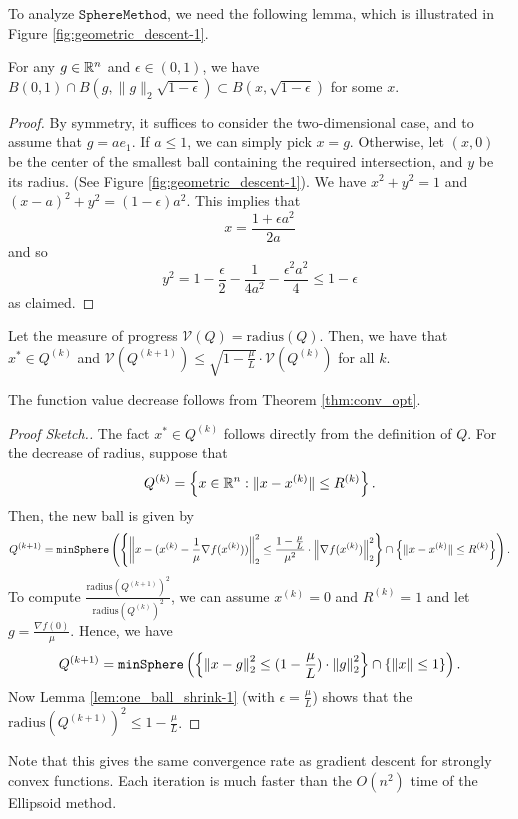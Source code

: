 To analyze $\mathtt{SphereMethod}$, we need the following lemma,
which is illustrated in Figure \ref{fig:geometric_descent-1}.
\begin{lem}
\label{lem:one_ball_shrink-1}For any $g\in\mathbb{R}^{n}$ and $\epsilon\in(0,1)$,
we have $B(0,1)\cap B(g,\|g\|_{2}\sqrt{1-\epsilon})\subset B(x,\sqrt{1-\epsilon})$
for some $x$.
\end{lem}

\begin{proof}
By symmetry, it suffices to consider the two-dimensional case, and
to assume that $g=ae_{1}$. If $a\leq1$, we can simply pick $x=g$.
Otherwise, let $(x,0)$ be the center of the smallest ball containing
the required intersection, and $y$ be its radius. (See Figure \ref{fig:geometric_descent-1}).
We have $x^{2}+y^{2}=1$ and $(x-a)^{2}+y^{2}=(1-\epsilon)a^{2}$.
This implies that 
\[
x=\frac{1+\epsilon a^{2}}{2a}
\]
and so 
\[
y^{2}=1-\frac{\epsilon}{2}-\frac{1}{4a^{2}}-\frac{\epsilon^{2}a^{2}}{4}\le1-\epsilon
\]
as claimed.
\end{proof}
\begin{lem}
Let the measure of progress $\mathcal{V}(Q)=\mathrm{radius}(Q)$.
Then, we have that $x^{*}\in Q^{(k)}$ and $\mathcal{V}(Q^{(k+1)})\leq\sqrt{1-\frac{\mu}{L}}\cdot\mathcal{V}(Q^{(k)})$
for all $k$.
\end{lem}

\begin{rem}
The function value decrease follows from Theorem \ref{thm:conv_opt}.
\end{rem}

\begin{proof}[Proof Sketch.]
The fact $x^{*}\in Q^{(k)}$ follows directly from the definition
of $Q$. For the decrease of radius, suppose that 
\[
Q^{(k)}=\left\{ x\in\mathbb{R}^{n}:\|x-x^{(k)}\|\leq R^{(k)}\right\} .
\]
Then, the new ball is given by
\[
Q^{(k+1)}=\mathtt{minSphere}\left(\left\{ \left\Vert x-(x^{(k)}-\frac{1}{\mu}\nabla f(x^{(k)}))\right\Vert^{2}_{2}\leq\frac{1-\frac{\mu}{L}}{\mu^{2}}\cdot\left\Vert \nabla f(x^{(k)})\right\Vert^{2}_{2}\right\} \cap\left\{ \|x-x^{(k)}\|\leq R^{(k)}\right\} \right).
\]
To compute $\frac{\mathrm{radius}(Q^{(k+1)})^{2}}{\mathrm{radius}(Q^{(k)})^{2}}$,
we can assume $x^{(k)}=0$ and $R^{(k)}=1$ and let $g=\frac{\nabla f(0)}{\mu}$.
Hence, we have
\[
Q^{(k+1)}=\mathtt{minSphere}\left(\left\{ \left\Vert x-g\right\Vert^{2}_{2}\leq(1-\frac{\mu}{L})\cdot\left\Vert g\right\Vert^{2}_{2}\right\} \cap\left\{ \|x\|\leq1\right\} \right).
\]
Now Lemma \ref{lem:one_ball_shrink-1} (with $\epsilon=\frac{\mu}{L}$)
shows that the $\mathrm{radius}(Q^{(k+1)})^{2}\leq1-\frac{\mu}{L}$.
\end{proof}
Note that this gives the same convergence rate as gradient descent
for strongly convex functions. Each iteration is much faster than
the $O(n^{2})$ time of the Ellipsoid method.

